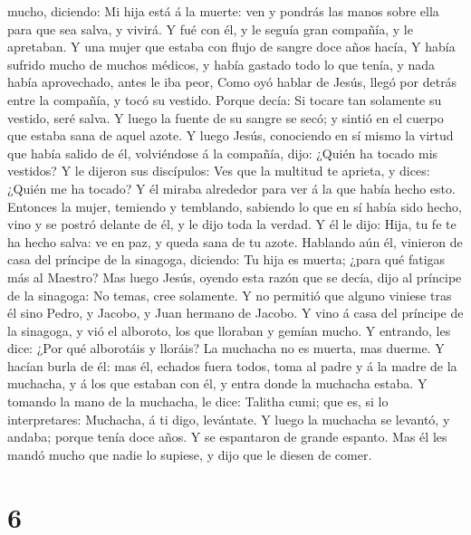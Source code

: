mucho, diciendo: Mi hija está á la muerte: ven y pondrás las manos sobre
ella para que sea salva, y vivirá.  Y fué con él, y le
seguía gran compañía, y le apretaban.  Y una mujer que
estaba con flujo de sangre doce años hacía,  Y había
sufrido mucho de muchos médicos, y había gastado todo lo que tenía, y
nada había aprovechado, antes le iba peor,  Como oyó hablar
de Jesús, llegó por detrás entre la compañía, y tocó su vestido.
 Porque decía: Si tocare tan solamente su vestido, seré
salva.  Y luego la fuente de su sangre se secó; y sintió en
el cuerpo que estaba sana de aquel azote.  Y luego Jesús,
conociendo en sí mismo la virtud que había salido de él, volviéndose á
la compañía, dijo: ¿Quién ha tocado mis vestidos?  Y le
dijeron sus discípulos: Ves que la multitud te aprieta, y dices: ¿Quién
me ha tocado?  Y él miraba alrededor para ver á la que
había hecho esto.  Entonces la mujer, temiendo y temblando,
sabiendo lo que en sí había sido hecho, vino y se postró delante de él,
y le dijo toda la verdad.  Y él le dijo: Hija, tu fe te ha
hecho salva: ve en paz, y queda sana de tu azote.  Hablando
aún él, vinieron de casa del príncipe de la sinagoga, diciendo: Tu hija
es muerta; ¿para qué fatigas más al Maestro?  Mas luego
Jesús, oyendo esta razón que se decía, dijo al príncipe de la sinagoga:
No temas, cree solamente.  Y no permitió que alguno viniese
tras él sino Pedro, y Jacobo, y Juan hermano de Jacobo.  Y
vino á casa del príncipe de la sinagoga, y vió el alboroto, los que
lloraban y gemían mucho.  Y entrando, les dice: ¿Por qué
alborotáis y lloráis? La muchacha no es muerta, mas duerme.
 Y hacían burla de él: mas él, echados fuera todos, toma al
padre y á la madre de la muchacha, y á los que estaban con él, y entra
donde la muchacha estaba.  Y tomando la mano de la
muchacha, le dice: Talitha cumi; que es, si lo interpretares: Muchacha,
á ti digo, levántate.  Y luego la muchacha se levantó, y
andaba; porque tenía doce años. Y se espantaron de grande espanto.
 Mas él les mandó mucho que nadie lo supiese, y dijo que le
diesen de comer.

\hypertarget{section-5}{%
\section{6}\label{section-5}}

